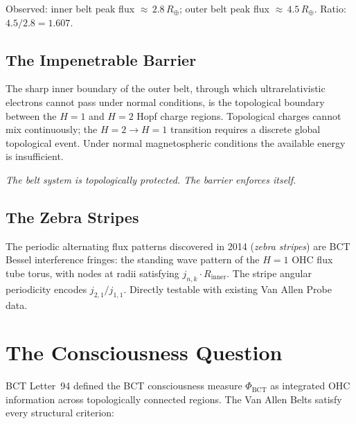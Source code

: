 \documentclass[aps,prl,twocolumn,superscriptaddress,floatfix]{revtex4-2}
\begin{document}
Observed: inner belt peak flux ${\approx}\,2.8\,R_\oplus$;
outer belt peak flux ${\approx}\,4.5\,R_\oplus$.
Ratio: $4.5/2.8 = 1.607$.

\noindent{}

\subsection{The Impenetrable Barrier}

The sharp inner boundary of the outer belt, through which
ultrarelativistic electrons cannot pass under normal conditions,
is the topological boundary between the $H=1$ and $H=2$ Hopf charge
regions. Topological charges cannot mix continuously; the
$H=2\to H=1$ transition requires a discrete global topological event.
Under normal magnetospheric conditions the available energy is
insufficient.

\textit{The belt system is topologically protected. The barrier
enforces itself.}

\subsection{The Zebra Stripes}

The periodic alternating flux patterns discovered in 2014
(\textit{zebra stripes}) are BCT Bessel interference fringes:
the standing wave pattern of the $H=1$ OHC flux tube torus, with
nodes at radii satisfying $j_{n,k}\cdot R_\mathrm{inner}$.
The stripe angular periodicity encodes $j_{2,1}/j_{1,1}$.
Directly testable with existing Van Allen Probe data.

\section{The Consciousness Question}

BCT Letter~94 defined the BCT consciousness measure $\Phi_\mathrm{BCT}$
as integrated OHC information across topologically connected regions.
The Van Allen Belts satisfy every structural criterion:
\end{document}
